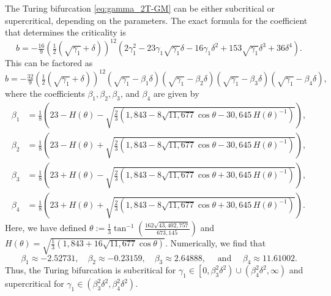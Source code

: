 \documentclass[11pt]{article}
\numberwithin{equation}{section}
\begin{document}
The Turing bifurcation \eqref{eq:gamma_2T-GM} can be either subcritical or supercritical, depending on the parameters.
The exact formula for the coefficient that determines the criticality is 
%
\[
    b = -\tfrac{16}{9}\left( \tfrac{1}{2} \left( \sqrt{\gamma_1}+\delta \right) \right)^{12} \left( 2\gamma_1^2 - 23 \gamma_1 \sqrt{\gamma_1} \delta - 16 \gamma_1 \delta^2+153 \sqrt{\gamma_1} \delta^3+36\delta^4 \right). 
\]
% 
This can be factored as
%
\begin{equation}\label{eq:HI-nf-b}
b = -\tfrac{32}{9} \left( \tfrac{1}{2} \left( \sqrt{\gamma_1}+\delta \right) \right)^{12} \left( \sqrt{\gamma_1}-\beta_1 \delta \right) \left( \sqrt{\gamma_1}-\beta_2 \delta \right)\left( \sqrt{\gamma_1}-\beta_3 \delta \right)\left( \sqrt{\gamma_1}-\beta_4 \delta \right), 
\end{equation} 
%
where the coefficients $\beta_1, \beta_2, \beta_3$, and $\beta_4$ are given by
%
\begin{equation*}
  \begin{split}
      \beta_1 &= \frac{1}{8} \left( 23 - H(\theta) - \sqrt{\frac{2}{3} \left( 1,843-8\sqrt{11,677} \cos \theta - 30,645\, H(\theta)^{-1} \right)} \right), \\ 
      \beta_2 &= \frac{1}{8} \left( 23 - H(\theta) + \sqrt{\frac{2}{3} \left( 1,843-8\sqrt{11,677} \cos \theta - 30,645\, H(\theta)^{-1} \right)} \right), \\
      \beta_3 &= \frac{1}{8} \left( 23 + H(\theta) - \sqrt{\frac{2}{3} \left( 1,843-8\sqrt{11,677} \cos \theta + 30,645\, H(\theta)^{-1} \right)} \right), \\
      \beta_4 &= \frac{1}{8} \left( 23 + H(\theta) + \sqrt{\frac{2}{3} \left( 1,843-8\sqrt{11,677} \cos \theta + 30,645\, H(\theta)^{-1} \right)} \right).
  \end{split}
\end{equation*}
%
Here, we have defined $\theta := \tfrac{1}{3} \tan^{-1} \left( \frac{162\sqrt{43,402,757}}{673,145} \right)$ and $H(\theta) = \sqrt{\frac{1}{3}\left( 1,843+16\sqrt{11,677}\cos \theta \right)}$.
Numerically, we find that 
%
\[ \beta_1 \approx -2.52731, \quad \beta_2 \approx -0.23159, \quad \beta_3 \approx 2.64888, \quad \text{ and } \quad \beta_4 \approx 11.61002. \]
%
Thus, the Turing bifurcation is subcritical for $\gamma_1 \in \left[0, \beta_3^2 \delta^2 \right) \cup \left(\beta_4^2\delta^2,\infty \right)$ and supercritical for $\gamma_1 \in \left( \beta_3^2 \delta^2 , \beta_4^2 \delta^2 \right)$.
\end{document}
